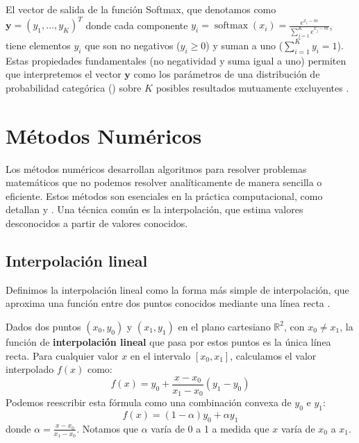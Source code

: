 \vspace{1em}
\noindent El vector de salida de la función Softmax, que denotamos como $\mathbf{y} = (y_1, \ldots, y_K)^T$ donde cada componente $y_i = \operatorname{softmax}(x_i) = \frac{e^{x_i-m}}{\sum_{j=1}^{K} e^{x_j-m}}$, tiene elementos $y_i$ que son no negativos ($y_i \ge 0$) y suman a uno ($\sum_{i=1}^K y_i = 1$). Estas propiedades fundamentales (no negatividad y suma igual a uno) permiten que interpretemos el vector $\mathbf{y}$ como los parámetros de una distribución de probabilidad categórica () sobre $K$ posibles resultados mutuamente excluyentes \citep{Bishop2006}.

\section{Métodos Numéricos}
\label{sec:numerical_methods}

Los métodos numéricos desarrollan algoritmos para resolver problemas matemáticos que no podemos resolver analíticamente de manera sencilla o eficiente. Estos métodos son esenciales en la práctica computacional, como detallan \citet{BurdenFaires2011} y \citet{KincaidCheney2002}. Una técnica común es la interpolación, que estima valores desconocidos a partir de valores conocidos.

\subsection{Interpolación lineal}
\label{subsec:interpolation}

Definimos la interpolación lineal como la forma más simple de interpolación, que aproxima una función entre dos puntos conocidos mediante una línea recta \citep{BurdenFaires2011}.

\begin{definition}
\label{def:linear_interpolation_func_general}
Dados dos puntos $(x_0, y_0)$ y $(x_1, y_1)$ en el plano cartesiano $\mathbb{R}^2$, con $x_0 \neq x_1$, la función de \textbf{interpolación lineal} que pasa por estos puntos es la única línea recta. Para cualquier valor $x$ en el intervalo $[x_0, x_1]$, calculamos el valor interpolado $f(x)$ como:
\[ f(x) = y_0 + \frac{x - x_0}{x_1 - x_0}(y_1 - y_0) \]
Podemos reescribir esta fórmula como una combinación convexa de $y_0$ e $y_1$:
\[ f(x) = (1-\alpha)y_0 + \alpha y_1 \]
donde $\alpha = \frac{x - x_0}{x_1 - x_0}$. Notamos que $\alpha$ varía de 0 a 1 a medida que $x$ varía de $x_0$ a $x_1$.
\end{definition}

